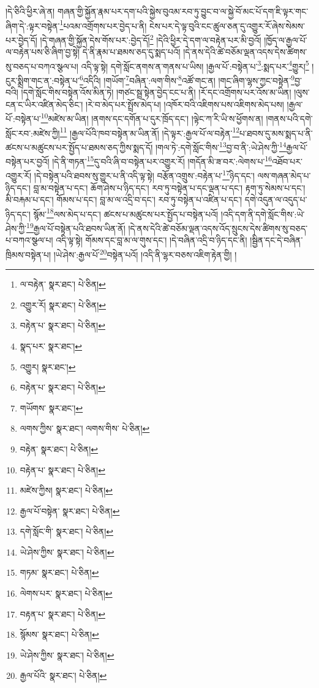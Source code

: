 །དེ་ཅིའི་ཕྱིར་ཞེ་ན། གཞན་གྱི་སྐྱོན་རྣམ་པར་དག་པའི་སྐྱེས་བུའམ་རབ་ཏུ་བྱུང་བ་ལ་སྐྱེ་བོ་མང་པོ་དག་ཇི་ལྟར་གང་ཞིག་དེ་:ལྟར་བསྟེན་\footnote{ལ་བརྟེན་  སྣར་ཐང་།  པེ་ཅིན། }པའམ་འགྲོགས་པར་བྱེད་པ་ནི། ངེས་པར་དེ་ལྟ་བུའི་ངང་ཚུལ་ཅན་དུ་འགྱུར་རོ་ཞེས་སེམས་པར་བྱེད་དོ། །དེ་གཞན་གྱི་སྐྱོན་དེས་གོས་པར་:བྱེད་དོ།\footnote{འགྱུར་རོ།  སྣར་ཐང་།  པེ་ཅིན། } །དེའི་ཕྱིར་དེ་དག་ལ་བརྟེན་པར་མི་བྱའོ། །ཁྱོད་ལ་རྒྱལ་པོ་ལ་བརྟེན་པས་ཅི་ཞིག་བྱ་སྟེ། དེ་ནི་རྣམ་པ་ཐམས་ཅད་དུ་སྨད་པའོ། །དེ་ནས་དེའི་ཚེ་བཅོམ་ལྡན་འདས་དེས་ཚིགས་སུ་བཅད་པ་བཀའ་སྩལ་པ། འདི་ལྟ་སྟེ། དགེ་སློང་ནགས་ན་གནས་པ་ཡིས། །རྒྱལ་པོ་:བསྟེན་པ་\footnote{བརྟེན་པ་  སྣར་ཐང་།  པེ་ཅིན། }:སྨད་པར་\footnote{སྣད་པར་  སྣར་ཐང་། }གྱུར།\footnote{འགྱུར།  སྣར་ཐང་། } །ངུར་སྨྲིག་གང་ན་:བསྟེན་པ་\footnote{བརྟེན་པ་  སྣར་ཐང་།  པེ་ཅིན། }འདིའི། །གཡོག་\footnote{གཡོགས་  སྣར་ཐང་། }བཞིན་:ལག་གིས་\footnote{ལགས་ཀྱིས་  སྣར་ཐང་། ལགས་གིས་  པེ་ཅིན། }འཚོ་གང་ན། །གང་ཞིག་ལྷས་ཀྱང་བསྟེན་\footnote{བརྟེན་  སྣར་ཐང་།  པེ་ཅིན། }བྱ་བའི། །དགེ་སློང་གིས་བསྟེན་འོས་མིན་ཏེ། །གཙང་སྦྲ་སྟེན་བྱེད་ངང་པ་ནི། །རོ་དང་འགྲོགས་པར་འོས་མ་ཡིན། །ལུས་ངན་ང་ཡིར་འཛིན་མེད་ཅིང་། །རེ་བ་མེད་པར་སྤྲོས་མེད་པ། །འཁོར་བའི་འཇིགས་པས་འཇིགས་མེད་པས། །རྒྱལ་པོ་:བསྟེན་པ་\footnote{བརྟེན་པ་  སྣར་ཐང་།  པེ་ཅིན། }མཛེས་མ་ཡིན། །ནགས་དང་དགོན་པ་དུར་ཁྲོད་དང་། །ལྟེང་ཀ་རི་ཡི་ས་ཕྱོགས་ན། །གནས་པའི་དགེ་སློང་རབ་:མཛེས་ཀྱི།\footnote{མཛེས་ཀྱིས།  སྣར་ཐང་།  པེ་ཅིན། } །རྒྱལ་པོའི་ཁབ་བསྟེན་མ་ཡིན་ནོ། །དེ་ལྟར་:རྒྱལ་པོ་ལ་བརྟེན་\footnote{རྒྱལ་པོ་བསྟེན་  སྣར་ཐང་།  པེ་ཅིན། }པ་ཐབས་དུ་མས་སྨད་པ་ནི་ཚངས་པ་མཚུངས་པར་སྤྱོད་པ་ཐམས་ཅད་ཀྱིས་སྨད་དོ། །གལ་ཏེ་:དགེ་སློང་གིས་\footnote{དགེ་སློང་གི་  སྣར་ཐང་།  པེ་ཅིན། }བྱ་བ་ནི་:ཡེ་ཤེས་ཀྱི་\footnote{ཡེ་ཤེས་ཀྱིས་  སྣར་ཐང་།  པེ་ཅིན། }རྒྱལ་པོ་བསྟེན་པར་བྱའོ། །དེ་ནི་གཏན་\footnote{གཏམ་  སྣར་ཐང་།  པེ་ཅིན། }དུ་བའི་ཞི་བ་བསྟེན་པར་འགྱུར་རོ། །གདོན་མི་ཟ་བར་:ལེགས་པ་\footnote{ལེགས་པར་  སྣར་ཐང་།  པེ་ཅིན། }འཐོབ་པར་འགྱུར་རོ། །དེ་བསྟེན་པའི་ཐབས་སུ་གྱུར་པ་ནི་འདི་ལྟ་སྟེ། བརྩོན་འགྲུས་:བརྟེན་པ་\footnote{བརྟན་པ་  སྣར་ཐང་།  པེ་ཅིན། }ཉིད་དང་། ལས་གཞན་མེད་པ་ཉིད་དང་། བླ་མ་བསྟེན་པ་དང་། ཆོག་ཤེས་པ་ཉིད་དང་། རབ་ཏུ་བསྟེན་པ་དང་ལྡན་པ་དང་། རྟག་ཏུ་སེམས་པ་དང་། མི་བརྐམ་པ་དང་། གོམས་པ་དང་། བླ་མ་ལ་འདྲི་བ་དང་། རབ་ཏུ་བསྟེན་པ་འཛིན་པ་དང་། དགེ་འདུན་ལ་འདུད་པ་ཉིད་དང་། སྙོམ་\footnote{སྙོམས་  སྣར་ཐང་།  པེ་ཅིན། }ལས་མེད་པ་དང་། ཚངས་པ་མཚུངས་པར་སྤྱོད་པ་བསྟེན་པའོ། །འདི་དག་ནི་དགེ་སློང་གིས་:ཡེ་ཤེས་ཀྱི་\footnote{ཡེ་ཤེས་ཀྱིས་  སྣར་ཐང་།  པེ་ཅིན། }རྒྱལ་པོ་བསྟེན་པའི་ཐབས་ཡིན་ནོ། །དེ་ནས་དེའི་ཚེ་བཅོམ་ལྡན་འདས་འོད་སྲུངས་དེས་ཚིགས་སུ་བཅད་པ་བཀའ་སྩལ་པ། འདི་ལྟ་སྟེ། གོམས་དང་བླ་མ་ལ་གུས་དང་། །དེ་བཞིན་འདྲི་བ་ཉིད་དང་ནི། །སྦྱིན་དང་དེ་བཞིན་ཁྲིམས་བསྟེན་པ། །ཡེ་ཤེས་:རྒྱལ་པོ་\footnote{རྒྱལ་པོའི་  སྣར་ཐང་།  པེ་ཅིན། }བསྟེན་པའོ། །འདི་ནི་ལྷར་བཅས་འཇིག་རྟེན་གྱི། །
